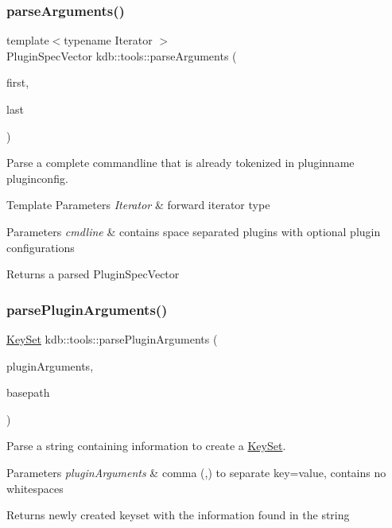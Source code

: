 \subsubsection{\texorpdfstring{parseArguments()}{parseArguments()}\hspace{0.1cm}{\footnotesize\ttfamily [2/2]}}
{\footnotesize\ttfamily template$<$typename Iterator $>$ \\
Plugin\+Spec\+Vector kdb\+::tools\+::parse\+Arguments (\begin{DoxyParamCaption}\item[{Iterator}]{first,  }\item[{Iterator}]{last }\end{DoxyParamCaption})}



Parse a complete commandline that is already tokenized in pluginname pluginconfig. 


\begin{DoxyTemplParams}{Template Parameters}
{\em Iterator} & forward iterator type\\
\hline
\end{DoxyTemplParams}

\begin{DoxyParams}{Parameters}
{\em cmdline} & contains space separated plugins with optional plugin configurations\\
\hline
\end{DoxyParams}
\begin{DoxyReturn}{Returns}
a parsed Plugin\+Spec\+Vector 
\end{DoxyReturn}
\mbox{\label{namespacekdb_1_1tools_ad4fdf9477ede38a219b02a7442965f6d}} 
\subsubsection{\texorpdfstring{parsePluginArguments()}{parsePluginArguments()}}
{\footnotesize\ttfamily \mbox{\hyperlink{classkdb_1_1KeySet}{Key\+Set}} kdb\+::tools\+::parse\+Plugin\+Arguments (\begin{DoxyParamCaption}\item[{std\+::string const \&}]{plugin\+Arguments,  }\item[{std\+::string const \&}]{basepath }\end{DoxyParamCaption})}



Parse a string containing information to create a \mbox{\hyperlink{classkdb_1_1KeySet}{Key\+Set}}. 


\begin{DoxyParams}{Parameters}
{\em plugin\+Arguments} & comma (,) to separate key=value, contains no whitespaces\\
\hline
\end{DoxyParams}
\begin{DoxyReturn}{Returns}
newly created keyset with the information found in the string 
\end{DoxyReturn}
